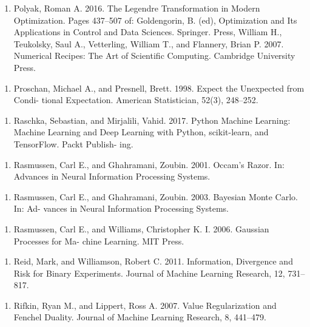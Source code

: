 \begin{enumerate}
\item Polyak, Roman A. 2016. The Legendre Transformation in Modern Optimization. Pages 437–507 of: Goldengorin, B. (ed), Optimization and Its Applications in Control and Data Sciences. Springer. Press, William H., Teukolsky, Saul A., Vetterling, William T., and Flannery, Brian P. 2007. Numerical Recipes: The Art of Scientiﬁc Computing. Cambridge University Press.
\end{enumerate}

\begin{enumerate}
\item Proschan, Michael A., and Presnell, Brett. 1998. Expect the Unexpected from Condi- tional Expectation. American Statistician, 52(3), 248–252.
\end{enumerate}

\begin{enumerate}
\item Raschka, Sebastian, and Mirjalili, Vahid. 2017. Python Machine Learning: Machine Learning and Deep Learning with Python, scikit-learn, and TensorFlow. Packt Publish- ing.
\end{enumerate}

\begin{enumerate}
\item Rasmussen, Carl E., and Ghahramani, Zoubin. 2001. Occam’s Razor. In: Advances in Neural Information Processing Systems.
\end{enumerate}

\begin{enumerate}
\item Rasmussen, Carl E., and Ghahramani, Zoubin. 2003. Bayesian Monte Carlo. In: Ad- vances in Neural Information Processing Systems.
\end{enumerate}

\begin{enumerate}
\item Rasmussen, Carl E., and Williams, Christopher K. I. 2006. Gaussian Processes for Ma- chine Learning. MIT Press.
\end{enumerate}

\begin{enumerate}
\item Reid, Mark, and Williamson, Robert C. 2011. Information, Divergence and Risk for Binary Experiments. Journal of Machine Learning Research, 12, 731–817.
\end{enumerate}

\begin{enumerate}
\item Rifkin, Ryan M., and Lippert, Ross A. 2007. Value Regularization and Fenchel Duality. Journal of Machine Learning Research, 8, 441–479.
\end{enumerate}

